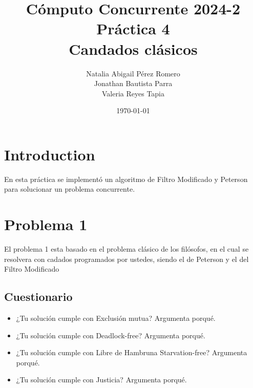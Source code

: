 \documentclass{article}
\title{Cómputo Concurrente 2024-2 \\ Práctica 4 \\  Candados clásicos}
\author{Natalia Abigail Pérez Romero\\
Jonathan Bautista Parra \\ Valeria Reyes Tapia}
\date{\today}
\begin{document}
\maketitle
\section{Introduction}
En esta práctica se implementó un algoritmo de Filtro Modificado y Peterson para solucionar un problema concurrente. 

\section{Problema 1}
El problema 1 esta basado en el problema clásico de los filósofos, en el cual se resolvera con cadados programados por ustedes, siendo el de Peterson y el del Filtro Modificado

\subsection{Cuestionario}

\begin{itemize}
    \item ¿Tu solución cumple con Exclusión mutua? Argumenta porqué.
    \item ¿Tu solución cumple con Deadlock-free? Argumenta porqué.
    \item ¿Tu solución cumple con Libre de Hambruna Starvation-free? Argumenta porqué.
    \item ¿Tu solución cumple con Justicia? Argumenta porqué.
\end{itemize}
\end{document}
